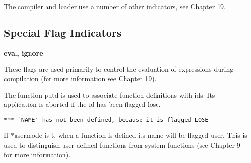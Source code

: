 \noindent
The  compiler and loader use a number of other indicators, see
Chapter 19.

\subsection{Special Flag Indicators}

\begin{Ventry}{\bf eval, ignore}
\item [{\bf eval, ignore}]  These flags are  used  primarily  to 
control  the
              evaluation  of expressions during compilation (for
              more information see Chapter 19).

\item [{\bf lose}]          The function putd is used  to 
associate  function
              definitions  with ids.  Its application is aborted
              if the id has been flagged lose.
\begin{verbatim}
*** `NAME' has not been defined, because it is flagged LOSE
\end{verbatim}

\item [{\bf user}]          If  *usermode is t, when a function is
defined its
              name will be  flagged  user.    This  is  used  to
              distinguish  user  defined  functions  from system
              functions (see Chapter 9 for more information).
\end{Ventry}
